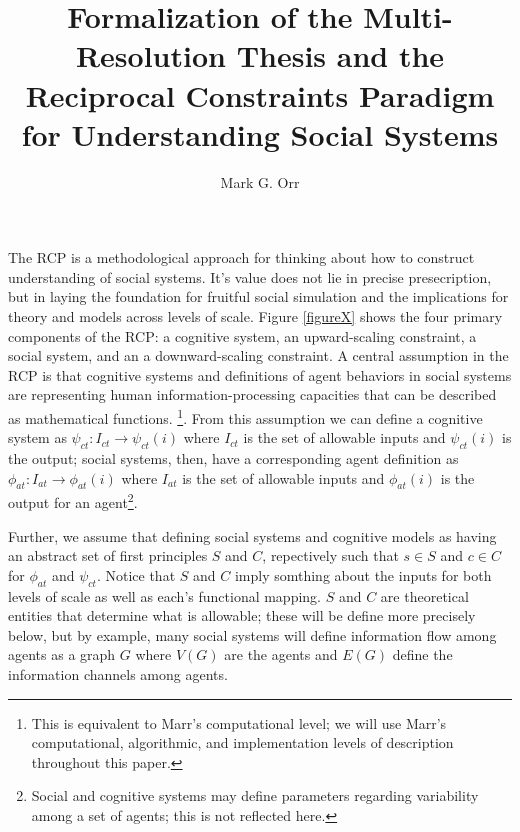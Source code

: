 \documentclass{article}
\title{Formalization of the Multi-Resolution Thesis and the Reciprocal Constraints Paradigm for Understanding Social Systems}
\author{Mark G. Orr}
\begin{document}
\maketitle
The RCP is a methodological approach for thinking about how to construct understanding of social systems.  It's value does not lie in precise presecription, but in laying the foundation for fruitful social simulation and the implications for theory and models across levels of scale.  Figure \ref{figureX} shows the four primary components of the RCP: a cognitive system, an upward-scaling constraint, a social system, and an a downward-scaling constraint. A central assumption in the RCP is that cognitive systems and definitions of agent behaviors in social systems are representing human information-processing capacities that can be described as mathematical functions. \cite{van Rooij, 2008}\footnote{This is equivalent to Marr's computational level; we will use Marr's computational, algorithmic, and implementation levels of description\cite{Marr,1981} throughout this paper.}. From this assumption we can define a cognitive system as $\psi_{ct}: I_{ct} \rightarrow \psi_{ct}(i)$ where $I_{ct}$ is the set of allowable inputs and $\psi_{ct}(i)$ is the output; social systems, then, have a corresponding agent definition as $\phi_{at}: I_{at} \rightarrow \phi_{at}(i)$ where $I_{at}$ is the set of allowable inputs and $\phi_{at}(i)$ is the output for an agent\footnote{Social and cognitive systems may define parameters regarding variability among a set of agents; this is not reflected here.}.  

Further, we assume that defining social systems and cognitive models as having an abstract set of first principles $S$ and $C$, repectively such that $s \in S$ and $c \in C$ for $\phi_{at}$ and $\psi_{ct}$. Notice that $S$ and $C$ imply somthing about the inputs for both levels of scale as well as each's functional mapping.  $S$ and $C$ are theoretical entities that determine what is allowable; these will be define more precisely below, but by example, many social systems will define information flow among agents as a graph $G$ where $V(G)$ are the agents and $E(G)$ define the information channels among agents.  

  
\end{document}
